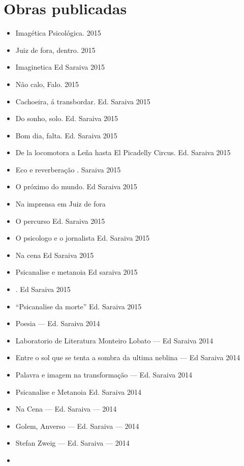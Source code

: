
\backmatter

\chapter{Obras publicadas}

\begin{itemize}
\itemsep1pt\parskip0pt
\item
  Imagética Psicológica. 2015
\item
  Juiz de fora, dentro. 2015
\item
  Imaginetica Ed Saraiva 2015
\item
  Não calo, Falo. 2015
\item
  Cachoeira, á transbordar. Ed. Saraiva 2015
\item
  Do sonho, solo. Ed. Saraiva 2015
\item
  Bom dia, falta. Ed. Saraiva 2015
\item
  De la locomotora a Leña hasta El Picadelly Circus. Ed. Saraiva 2015
\item
  Eco e reverberação . Saraiva 2015
\item
  O próximo do mundo. Ed Saraiva 2015
\item
  Na imprensa em Juiz de fora
\item
  O percurso Ed. Saraiva 2015
\item
  O psicologo e o jornalista Ed. Saraiva 2015
\item
  Na cena Ed Saraiva 2015
\item
  Psicanalise e metanoia Ed saraiva 2015
\item
    . Ed Saraiva 2015
\item
  ``Psicanalise da morte'' Ed. Saraiva 2015
\item
  Poesia --- Ed. Saraiva 2014
\item
  Laboratorio de Literatura Monteiro Lobato --- Ed Saraiva 2014
\item
  Entre o sol que se tenta a sombra da ultima neblina --- Ed Saraiva
  2014
\item
  Palavra e imagem na transformação --- Ed. Saraiva 2014
\item
  Psicanalise e Metanoia Ed. Saraiva 2014
\item
  Na Cena --- Ed. Saraiva --- 2014
\item
  Golem, Anverso --- Ed. Saraiva --- 2014
\item
  Stefan Zweig --- Ed. Saraiva --- 2014
\item

\end{itemize}
